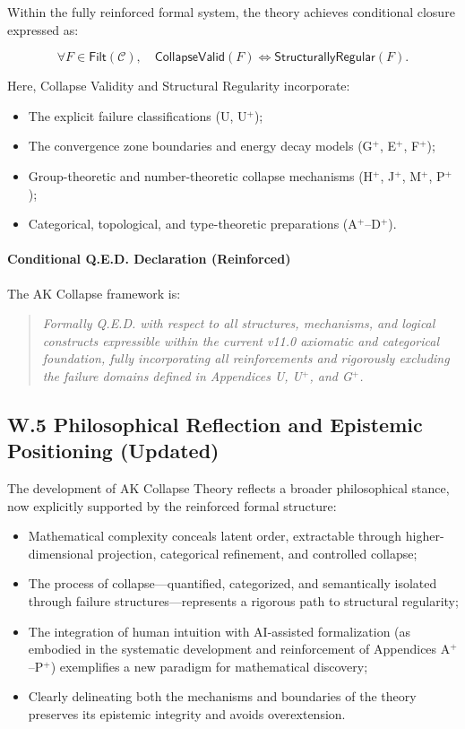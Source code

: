 \documentclass[11pt]{article}
\begin{document}
Within the fully reinforced formal system, the theory achieves conditional closure expressed as:

\[
\forall F \in \mathsf{Filt}(\mathcal{C}), \quad \mathsf{CollapseValid}(F) \iff \mathsf{StructurallyRegular}(F).
\]

Here, Collapse Validity and Structural Regularity incorporate:

\begin{itemize}
    \item The explicit failure classifications (U, U$^{+}$);
    \item The convergence zone boundaries and energy decay models (G$^{+}$, E$^{+}$, F$^{+}$);
    \item Group-theoretic and number-theoretic collapse mechanisms (H$^{+}$, J$^{+}$, M$^{+}$, P$^{+}$);
    \item Categorical, topological, and type-theoretic preparations (A$^{+}$–D$^{+}$).
\end{itemize}

\paragraph{Conditional Q.E.D. Declaration (Reinforced)}  
The AK Collapse framework is:

\begin{quote}
\textit{Formally Q.E.D. with respect to all structures, mechanisms, and logical constructs expressible within the current v11.0 axiomatic and categorical foundation, fully incorporating all reinforcements and rigorously excluding the failure domains defined in Appendices U, U$^{+}$, and G$^{+}$.}
\end{quote}

\subsection*{W.5 Philosophical Reflection and Epistemic Positioning (Updated)}

The development of AK Collapse Theory reflects a broader philosophical stance, now explicitly supported by the reinforced formal structure:

\begin{itemize}
    \item Mathematical complexity conceals latent order, extractable through higher-dimensional projection, categorical refinement, and controlled collapse;
    \item The process of collapse—quantified, categorized, and semantically isolated through failure structures—represents a rigorous path to structural regularity;
    \item The integration of human intuition with AI-assisted formalization (as embodied in the systematic development and reinforcement of Appendices A$^{+}$–P$^{+}$) exemplifies a new paradigm for mathematical discovery;
    \item Clearly delineating both the mechanisms and boundaries of the theory preserves its epistemic integrity and avoids overextension.
\end{itemize}
\end{document}
